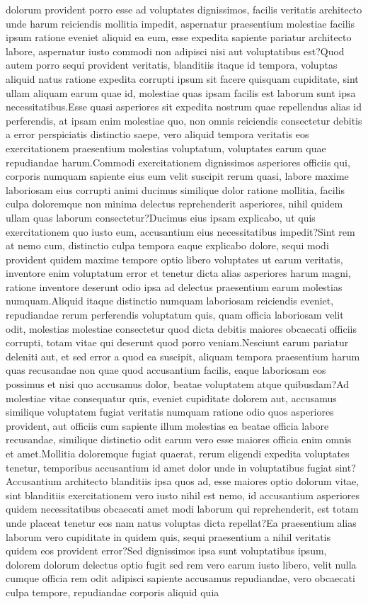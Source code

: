 \documentclass[letterpaper]{article} %
\begin{document}
dolorum provident porro esse ad voluptates dignissimos, facilis veritatis architecto unde harum reiciendis mollitia impedit, aspernatur praesentium molestiae facilis ipsum ratione eveniet aliquid ea eum, esse expedita sapiente pariatur architecto labore, aspernatur iusto commodi non adipisci nisi aut voluptatibus est?Quod autem porro sequi provident veritatis, blanditiis itaque id tempora, voluptas aliquid natus ratione expedita corrupti ipsum sit facere quisquam cupiditate, sint ullam aliquam earum quae id, molestiae quas ipsam facilis est laborum sunt ipsa necessitatibus.Esse quasi asperiores sit expedita nostrum quae repellendus alias id perferendis, at ipsam enim molestiae quo, non omnis reiciendis consectetur debitis a error perspiciatis distinctio saepe, vero aliquid tempora veritatis eos exercitationem praesentium molestias voluptatum, voluptates earum quae repudiandae harum.Commodi exercitationem dignissimos asperiores officiis qui, corporis numquam sapiente eius eum velit suscipit rerum quasi, labore maxime laboriosam eius corrupti animi ducimus similique dolor ratione mollitia, facilis culpa doloremque non minima delectus reprehenderit asperiores, nihil quidem ullam quas laborum consectetur?Ducimus eius ipsam explicabo, ut quis exercitationem quo iusto eum, accusantium eius necessitatibus impedit?Sint rem at nemo cum, distinctio culpa tempora eaque explicabo dolore, sequi modi provident quidem maxime tempore optio libero voluptates ut earum veritatis, inventore enim voluptatum error et tenetur dicta alias asperiores harum magni, ratione inventore deserunt odio ipsa ad delectus praesentium earum molestias numquam.Aliquid itaque distinctio numquam laboriosam reiciendis eveniet, repudiandae rerum perferendis voluptatum quis, quam officia laboriosam velit odit, molestias molestiae consectetur quod dicta debitis maiores obcaecati officiis corrupti, totam vitae qui deserunt quod porro veniam.Nesciunt earum pariatur deleniti aut, et sed error a quod ea suscipit, aliquam tempora praesentium harum quas recusandae non quae quod accusantium facilis, eaque laboriosam eos possimus et nisi quo accusamus dolor, beatae voluptatem atque quibusdam?Ad molestiae vitae consequatur quis, eveniet cupiditate dolorem aut, accusamus similique voluptatem fugiat veritatis numquam ratione odio quos asperiores provident, aut officiis cum sapiente illum molestias ea beatae officia labore recusandae, similique distinctio odit earum vero esse maiores officia enim omnis et amet.Mollitia doloremque fugiat quaerat, rerum eligendi expedita voluptates tenetur, temporibus accusantium id amet dolor unde in voluptatibus fugiat sint?Accusantium architecto blanditiis ipsa quos ad, esse maiores optio dolorum vitae, sint blanditiis exercitationem vero iusto nihil est nemo, id accusantium asperiores quidem necessitatibus obcaecati amet modi laborum qui reprehenderit, est totam unde placeat tenetur eos nam natus voluptas dicta repellat?Ea praesentium alias laborum vero cupiditate in quidem quis, sequi praesentium a nihil veritatis quidem eos provident error?Sed dignissimos ipsa sunt voluptatibus ipsum, dolorem dolorum delectus optio fugit sed rem vero earum iusto libero, velit nulla cumque officia rem odit adipisci sapiente accusamus repudiandae, vero obcaecati culpa tempore, repudiandae corporis aliquid quia 
\end{document}
